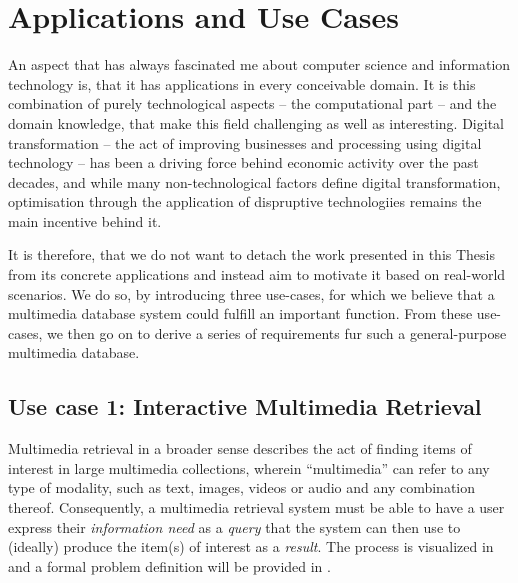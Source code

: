 \chapter{Applications and Use Cases}
\label{chapter:applications}

An aspect that has always fascinated me about computer science and information technology is, that it has applications in every conceivable domain. It is this combination of purely technological aspects -- the computational part -- and the domain knowledge, that make this field challenging as well as interesting. Digital transformation -- the act of improving businesses and processing using digital technology \cite{Vial:2019Understanding} -- has been a driving force behind economic activity over the past decades, and while many non-technological factors define digital transformation, optimisation through the application of dispruptive technologiies remains the main incentive behind it.

It is therefore, that we do not want to detach the work presented in this Thesis from its concrete applications and instead aim to motivate it based on real-world scenarios. We do so, by introducing three use-cases, for which we believe that a multimedia database system could fulfill an important function. From these use-cases, we then go on to derive a series of requirements fur such a general-purpose multimedia database.

\section{Use case 1: Interactive Multimedia Retrieval}
\label{section:application_retrieval}

Multimedia retrieval in a broader sense describes the act of finding items of interest in large multimedia collections, wherein ``multimedia'' can refer to any type of modality, such as text, images, videos or audio and any combination thereof. Consequently, a multimedia retrieval system must be able to have a user express their \emph{information need} as a \emph{query} that the system can then use to (ideally) produce the item(s) of interest as a \emph{result}. The process is visualized in  and a formal problem definition will be provided in .

